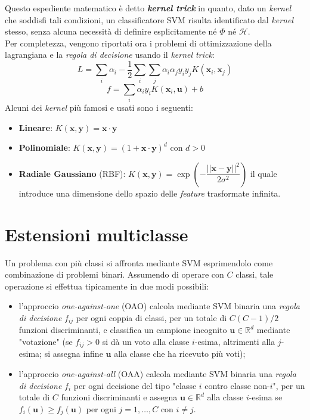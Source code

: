 Questo espediente matematico è detto \textbf{\emph{kernel trick}} in quanto, dato un \emph{kernel} che soddisfi tali condizioni, un classificatore SVM risulta identificato dal \emph{kernel} stesso, senza alcuna necessità di definire esplicitamente né $\Phi$ né $\mathcal{H}$.
\\
Per completezza, vengono riportati ora i problemi di ottimizzazione della lagrangiana e la \emph{regola di decisione} usando il \emph{kernel trick}:
\begin{equation}
\label{eq:lagrangiana_con_kernel}
L=\sum_i\alpha_i-\dfrac{1}{2}\sum_i\sum_j\alpha_i\alpha_jy_iy_jK(\mathbf{x}_i,\mathbf{x}_j)
\end{equation}
\begin{equation}
\label{eq:regola_di_decisione_con_kernel}
f=\sum_i\alpha_iy_iK(\mathbf{x}_i,\mathbf{u})+b
\end{equation}
Alcuni dei \emph{kernel} più famosi e usati sono i seguenti:
\begin{itemize}
\item \textbf{Lineare}: $K(\mathbf{x},\mathbf{y})=\mathbf{x}\cdot\mathbf{y}$
\item \textbf{Polinomiale}: $K(\mathbf{x},\mathbf{y})=\left (1+\mathbf{x}\cdot\mathbf{y}\right )^d$ con $d>0$
\item \textbf{Radiale Gaussiano} (RBF):  $K(\mathbf{x},\mathbf{y})=\exp\left (-\dfrac{\vert\vert\mathbf{x}-\mathbf{y}\vert\vert^2}{2\sigma^2}\right )$ il quale introduce una dimensione dello spazio delle \emph{feature} trasformate infinita.
\end{itemize}
\section{Estensioni multiclasse}
Un problema con più classi si affronta mediante SVM esprimendolo come combinazione di problemi binari. Assumendo di operare con $C$ classi, tale operazione si effettua tipicamente in due modi possibili:
\begin{itemize}
\item l'approccio \emph{one-against-one} (OAO) calcola mediante SVM binaria una \emph{regola di decisione} $f_{ij}$ per ogni coppia di classi, per un totale di $C(C-1)/2$ funzioni discriminanti, e classifica un campione incognito $\mathbf{u}\in\mathbb{R}^d$ mediante "votazione" (se $f_{ij}>0$ si dà un voto alla classe $i$-esima, altrimenti alla $j$-esima; si assegna infine $\mathbf{u}$ alla classe che ha ricevuto più voti);
\item l'approccio \emph{one-against-all} (OAA) calcola mediante SVM binaria una \emph{regola di decisione} $f_{i}$ per ogni decisione del tipo "classe $i$ contro classe non-$i$", per un totale di $C$ funzioni discriminanti e assegna $\mathbf{u}\in\mathbb{R}^d$ alla classe $i$-esima se $f_i(\mathbf{u})\geq f_j(\mathbf{u})$ per ogni $j=1,\ldots,C$ con $i\neq j$.
\end{itemize}


